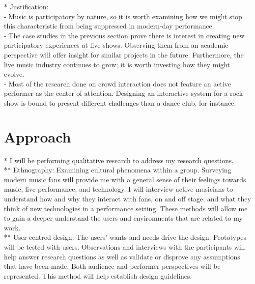 * Justification:\\
- Music is participatory by nature, so it is worth examining how we might stop this characteristic from being suppressed in modern-day performance.\\
- The case studies in the previous section prove there is interest in creating new participatory experiences at live shows. Observing them from an academic perspective will offer insight for similar projects in the future. Furthermore, the live music industry continues to grow; it is worth investing how they might evolve.\\
- Most of the research done on crowd interaction does not feature an active performer as the center of attention. Designing an interactive system for a rock show is bound to present different challenges than a dance club, for instance.


\section{Approach}

* I will be performing qualitative research to address my research questions.\\
** Ethnography: Examining cultural phenomena within a group. Surveying modern music fans will provide me with a general sense of their feelings towards music, live performance, and technology. I will interview active musicians to understand how and why they interact with fans, on and off stage, and what they think of new technologies in a performance setting. These methods will allow me to gain a deeper understand the users and environments that are related to my work.\\
** User-centred design: The users' wants and needs drive the design. Prototypes will be tested with users. Observations and interviews with the participants will help answer research questions as well as validate or disprove any assumptions that have been made. Both audience and performer perspectives will be represented. This method will help establish design guidelines.


